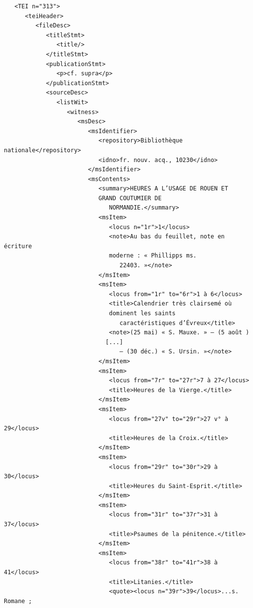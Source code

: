 \documentclass[a4paper,12pt,twoside]{book}
\begin{document}
\begin{verbatim}
   <TEI n="313">
      <teiHeader>
         <fileDesc>
            <titleStmt>
               <title/>
            </titleStmt>
            <publicationStmt>
               <p>cf. supra</p>
            </publicationStmt>
            <sourceDesc>
               <listWit>
                  <witness>
                     <msDesc>
                        <msIdentifier>
                           <repository>Bibliothèque nationale</repository>
                           <idno>fr. nouv. acq., 10230</idno>
                        </msIdentifier>
                        <msContents>
                           <summary>HEURES A L’USAGE DE ROUEN ET 
                           GRAND COUTUMIER DE
                              NORMANDIE.</summary>
                           <msItem>
                              <locus n="1r">1</locus>
                              <note>Au bas du feuillet, note en écriture
                              moderne : « Phillipps ms.
                                 22403. »</note>
                           </msItem>
                           <msItem>
                              <locus from="1r" to="6r">1 à 6</locus>
                              <title>Calendrier très clairsemé où 
                              dominent les saints
                                 caractéristiques d’Évreux</title>
                              <note>(25 mai) « S. Mauxe. » — (5 août )
                             [...]
                                 — (30 déc.) « S. Ursin. »</note>
                           </msItem>
                           <msItem>
                              <locus from="7r" to="27r">7 à 27</locus>
                              <title>Heures de la Vierge.</title>
                           </msItem>
                           <msItem>
                              <locus from="27v" to="29r">27 v° à 29</locus>
                              <title>Heures de la Croix.</title>
                           </msItem>
                           <msItem>
                              <locus from="29r" to="30r">29 à 30</locus>
                              <title>Heures du Saint-Esprit.</title>
                           </msItem>
                           <msItem>
                              <locus from="31r" to="37r">31 à 37</locus>
                              <title>Psaumes de la pénitence.</title>
                           </msItem>
                           <msItem>
                              <locus from="38r" to="41r">38 à 41</locus>
                              <title>Litanies.</title>
                              <quote><locus n="39r">39</locus>...s. Romane ; 

\end{verbatim}
\end{document}
